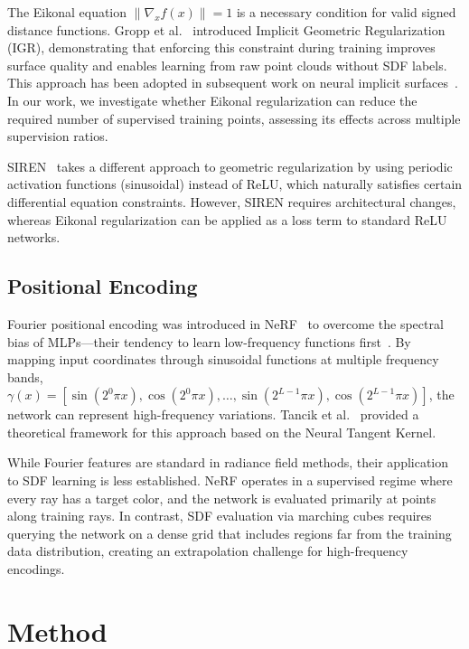 \documentclass[conference]{IEEEtran}
\begin{document}
The Eikonal equation $\|\nabla_x f(x)\| = 1$ is a necessary condition for valid signed distance functions. Gropp et al.~\cite{igr} introduced Implicit Geometric Regularization (IGR), demonstrating that enforcing this constraint during training improves surface quality and enables learning from raw point clouds without SDF labels. This approach has been adopted in subsequent work on neural implicit surfaces~\cite{volsdf, neus}. In our work, we investigate whether Eikonal regularization can reduce the required number of supervised training points, assessing its effects across multiple supervision ratios.

SIREN~\cite{siren} takes a different approach to geometric regularization by using periodic activation functions (sinusoidal) instead of ReLU, which naturally satisfies certain differential equation constraints. However, SIREN requires architectural changes, whereas Eikonal regularization can be applied as a loss term to standard ReLU networks.

\subsection{Positional Encoding}

Fourier positional encoding was introduced in NeRF~\cite{nerf} to overcome the spectral bias of MLPs---their tendency to learn low-frequency functions first~\cite{spectralbias}. By mapping input coordinates through sinusoidal functions at multiple frequency bands, $\gamma(x) = [\sin(2^0\pi x), \cos(2^0\pi x), \ldots, \sin(2^{L-1}\pi x), \cos(2^{L-1}\pi x)]$, the network can represent high-frequency variations. Tancik et al.~\cite{fourierfeatures} provided a theoretical framework for this approach based on the Neural Tangent Kernel.

While Fourier features are standard in radiance field methods, their application to SDF learning is less established. NeRF operates in a supervised regime where every ray has a target color, and the network is evaluated primarily at points along training rays. In contrast, SDF evaluation via marching cubes requires querying the network on a dense grid that includes regions far from the training data distribution, creating an extrapolation challenge for high-frequency encodings.

\section{Method}
\label{sec:method}
\end{document}
